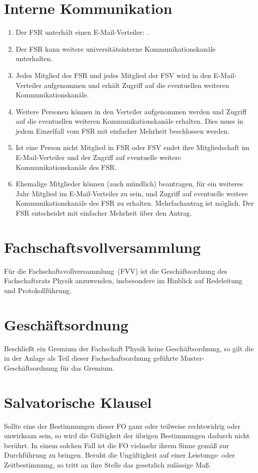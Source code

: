 \section{Interne Kommunikation}
\begin{enumerate}
	\item Der FSR unterhält einen E-Mail-Verteiler: .
	\item Der FSR kann weitere universitätsinterne Kommunikationskanäle unterhalten.
	\item Jedes Mitglied des FSR und jedes Mitglied der FSV wird in den E-Mail-Verteiler aufgenommen und erhält Zugriff auf die eventuellen weiteren Kommunikationskanäle.
	\item Weitere Personen können in den Verteiler aufgenommen werden und Zugriff auf die eventuellen weiteren Kommunikationskanäle erhalten. Dies muss in jedem Einzelfall vom FSR mit einfacher Mehrheit beschlossen werden.
	\item Ist eine Person nicht Mitglied in FSR oder FSV endet ihre Mitgliedschaft im E-Mail-Verteiler und der Zugriff auf eventuelle weitere Kommunikationskanäle des FSR.
	\item Ehemalige Mitglieder können (auch mündlich) beantragen, für ein weiteres Jahr Mitglied im E-Mail-Verteiler zu sein, und Zugriff auf eventuelle weitere Kommunikationskanäle des FSR zu erhalten.
		Mehrfachantrag ist möglich.
		Der FSR entscheidet mit einfacher Mehrheit über den Antrag.
\end{enumerate}

\section{Fachschaftsvollversammlung}
Für die Fachschaftsvollversammlung~(FVV) ist die Geschäftsordnung des Fachschaftsrats Physik anzuwenden, insbesondere im Hinblick auf Redeleitung und Protokollführung.

\section{Geschäftsordnung}
Beschließt ein Gremium der Fachschaft Physik keine Geschäftsordnung, so gilt die in der Anlage als Teil dieser Fachschaftsordnung geführte Muster-Geschäftsordnung für das Gremium.

\section{Salvatorische Klausel}
Sollte eine der Bestimmungen dieser FO ganz oder teilweise rechtswidrig oder unwirksam sein, so wird die Gültigkeit der übrigen Bestimmungen dadurch nicht berührt. In einem solchen Fall ist die FO vielmehr ihrem Sinne gemäß zur Durchführung zu bringen. Beruht die Ungültigkeit auf einer Leistungs- oder Zeitbestimmung, so tritt an ihre Stelle das gesetzlich zulässige Maß.

